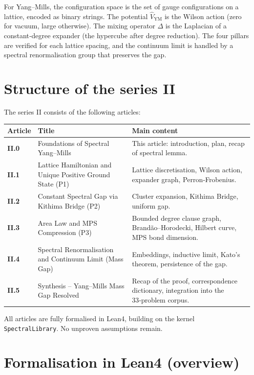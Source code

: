 \documentclass[11pt,a4paper]{article}
\begin{document}
For Yang–Mills, the configuration space is the set of gauge configurations on a lattice, encoded as binary strings. The potential $\hat{V}_{\mathrm{YM}}$ is the Wilson action (zero for vacuum, large otherwise). The mixing operator $\Delta$ is the Laplacian of a constant‑degree expander (the hypercube after degree reduction). The four pillars are verified for each lattice spacing, and the continuum limit is handled by a spectral renormalisation group that preserves the gap.

\section{Structure of the series II}

The series II consists of the following articles:

\begin{center}
\small
\begin{tabular}{@{}>{\bfseries}l>{\raggedright\arraybackslash}p{4.5cm}>{\raggedright\arraybackslash}p{6cm}@{}}
\toprule
\textbf{Article} & \textbf{Title} & \textbf{Main content} \\
\midrule
II.0 & Foundations of Spectral Yang–Mills & This article: introduction, plan, recap of spectral lemma. \\
II.1 & Lattice Hamiltonian and Unique Positive Ground State (P1) & Lattice discretisation, Wilson action, expander graph, Perron‑Frobenius. \\
II.2 & Constant Spectral Gap via Kithima Bridge (P2) & Cluster expansion, Kithima Bridge, uniform gap. \\
II.3 & Area Law and MPS Compression (P3) & Bounded degree clause graph, Brandão–Horodecki, Hilbert curve, MPS bond dimension. \\
II.4 & Spectral Renormalisation and Continuum Limit (Mass Gap) & Embeddings, inductive limit, Kato's theorem, persistence of the gap. \\
II.5 & Synthesis – Yang–Mills Mass Gap Resolved & Recap of the proof, correspondence dictionary, integration into the 33‑problem corpus. \\
\bottomrule
\end{tabular}
\end{center}

All articles are fully formalised in Lean4, building on the kernel \texttt{SpectralLibrary}. No unproven assumptions remain.

\section{Formalisation in Lean4 (overview)}
\end{document}
